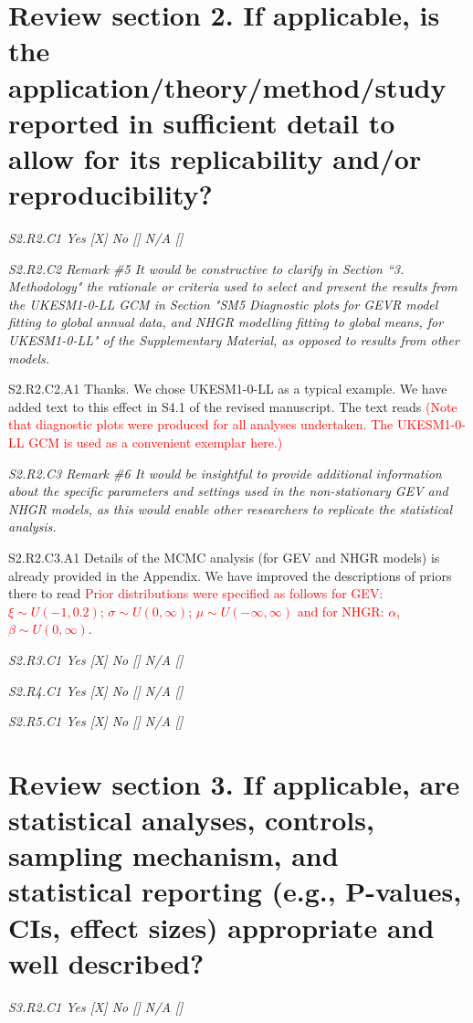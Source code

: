 \documentclass[a4paper,10pt]{article}
\newcommand{\ed}[1]{\textcolor{red}{#1}}
\begin{document}
	\section*{Review section 2. If applicable, is the application/theory/method/study reported in sufficient detail to allow for its replicability and/or reproducibility?}
	
	\emph{S2.R2.C1 Yes [X] No [] N/A []}
		
	\emph{S2.R2.C2 Remark \#5 It would be constructive to clarify in Section “3. Methodology" the rationale or criteria used to select and present the results from the UKESM1-0-LL GCM in Section "SM5 Diagnostic plots for GEVR model fitting to global annual data, and NHGR modelling fitting to global means, for UKESM1-0-LL" of the Supplementary Material, as opposed to results from other models.}
	
	S2.R2.C2.A1 Thanks. We chose UKESM1-0-LL as a typical example. We have added text to this effect in S4.1 of the revised manuscript. The text reads \ed{(Note that diagnostic plots were produced for all analyses undertaken. The UKESM1-0-LL GCM is used as a convenient exemplar here.)}
		
	\emph{S2.R2.C3 Remark \#6 It would be insightful to provide additional information about the specific parameters and settings used in the non-stationary GEV and NHGR models, as this would enable other researchers to replicate the statistical analysis.}
	
	S2.R2.C3.A1 Details of the MCMC analysis (for GEV and NHGR models) is already provided in the Appendix. We have improved the descriptions of priors there to read \ed{Prior distributions were specified as follows for GEV: $\xi \sim U(-1,0.2)$; $\sigma \sim U(0,\infty)$; $\mu \sim U(-\infty, \infty)$ and for NHGR: $\alpha$, $\beta \sim U(0,\infty)$}. 
	
	\emph{S2.R3.C1 Yes [X] No [] N/A []}

	\emph{S2.R4.C1 Yes [X] No [] N/A []}

	\emph{S2.R5.C1 Yes [X] No [] N/A []}

	\section*{Review section 3. If applicable, are statistical analyses, controls, sampling mechanism, and statistical reporting (e.g., P-values, CIs, effect sizes) appropriate and well described?}

	\emph{S3.R2.C1 Yes [X] No [] N/A []}
	
\end{document}

